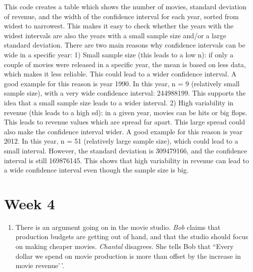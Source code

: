 \documentclass[
]{article}
\providecommand{\tightlist}{%
  \setlength{\itemsep}{0pt}\setlength{\parskip}{0pt}}
\begin{document}
This code creates a table which shows the number of movies, standard
deviation of revenue, and the width of the confidence interval for each
year, sorted from widest to narrowest. This makes it easy to check
whether the years with the widest intervals are also the years with a
small sample size and/or a large standard deviation. There are two main
reasons why confidence intervals can be wide in a specific year: 1)
Small sample size (this leads to a low n): if only a couple of movies
were released in a specific year, the mean is based on less data, which
makes it less reliable. This could lead to a wider confidence interval.
A good example for this reason is year 1990. In this year, n = 9
(relatively small sample size), with a very wide confidence interval:
244988199. This supports the idea that a small sample size leads to a
wider interval. 2) High variability in revenue (this leads to a high
sd): in a given year, movies can be hits or big flops. This leads to
revenue values which are spread far apart. This large spread could also
make the confidence interval wider. A good example for this reason is
year 2012. In this year, n = 51 (relatively large sample size), which
could lead to a small interval. However, the standard deviation is
309479166, and the confidence interval is still 169876145. This shows
that high variability in revenue can lead to a wide confidence interval
even though the sample size is big.

\section{Week 4}\label{week-4}

\begin{enumerate}
\def\labelenumi{\arabic{enumi}.}
\tightlist
\item
  There is an argument going on in the movie studio. \emph{Bob} claims
  that production budgets are getting out of hand, and that the studio
  should focus on making cheaper movies. \emph{Chantal} disagrees. She
  tells Bob that ``Every dollar we spend on movie production is more
  than offset by the increase in movie revenue'\,'.
\end{enumerate}
\end{document}
